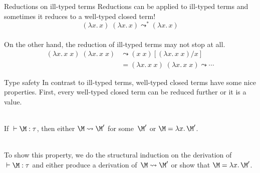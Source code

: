 \begin{frame}{Reductions on ill-typed terms}
  Reductions can be applied to ill-typed terms
  and sometimes it reduces to a well-typed closed term! 
  \[
        (\lambda x.\,x)\;(\lambda x.\,x)
        \leadsto^* (\lambda x.\, x)
  \]
  ~\\

  On the other hand, 
  the reduction of ill-typed terms may not stop at all.
  \begin{align*}
    (\lambda x.\, x\; x)\;(\lambda x.\, x\; x)
    & \leadsto (x\; x)[(\lambda x.\, x\; x)/ x] \\
    & = (\lambda x.\, x\; x)\;(\lambda x.\, x\; x) 
    \leadsto \cdots
  \end{align*}
\end{frame}

\begin{frame}{Type safety}
  In contrast to ill-typed terms, well-typed closed terms have some nice
  properties.  First, every well-typed closed term can be reduced further or it
  is a
  \alert{value}.
  \\~\\
  \begin{theorem}
    If ${}\vdash \M:\tau$, then either $\M \leadsto \M'$ for some~$\M'$
    or $\M = \lambda x.\, \M'$. 
  \end{theorem}
  ~\\
  To show this property, we do the structural induction on the derivation
  of~${}\vdash \M : \tau$ and either produce a derivation of~$\M \leadsto \M'$
  or show that $\M = \lambda x.\, \M'$.
\end{frame}

